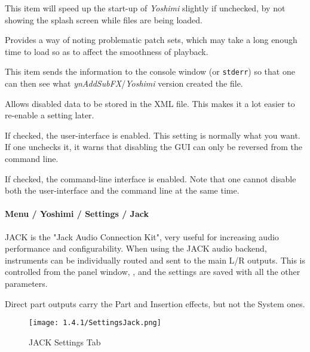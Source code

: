    This item will speed up the start-up of \textsl{Yoshimi} slightly
   if unchecked, by not showing the splash screen while files are being loaded.

   Provides a way of noting problematic patch sets, which may take a long
   enough time to load so as to affect the smoothness of playback.

   This item sends the information to the console window
   (or \texttt{stderr}) so that
   one can then see what \textsl{ynAddSubFX}/\textsl{Yoshimi}
   version created the file.

   Allows disabled data to be stored in the XML file.
   This makes it a lot easier to re-enable a setting later.

   If checked, the user-interface is enabled.  This setting is normally what you
   want.  If one unchecks it, it warns that disabling the GUI
   can only be reversed from the command line.

   If checked, the command-line interface is enabled.
   Note that one cannot disable both the user-interface and the command line
   at the same time.

\paragraph{Menu / Yoshimi / Settings / Jack}
\label{paragraph:menu_yoshimi_settings_jack}

   JACK is the "Jack Audio Connection Kit", very useful for increasing audio
   performance and configurability.
   When using the JACK audio backend, instruments can be individually routed
   and sent to the main L/R outputs. This is controlled from the
   panel window,
   ,
   and the settings are saved with all the other parameters.

   Direct part outputs carry the Part and Insertion effects, but not the
   System ones.

\begin{figure}[H]
   \centering 
   \texttt{[image: 1.4.1/SettingsJack.png]}
   \caption[JACK Settings]{JACK Settings Tab}
   \label{fig:yoshimi_settings_jack_tab}
\end{figure}

